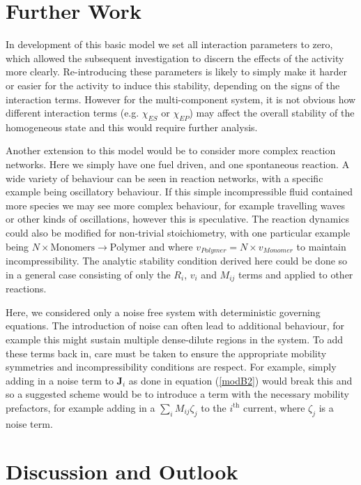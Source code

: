 \section{Further Work}

In development of this basic model we set all interaction parameters to zero, which allowed the subsequent investigation to discern the effects of the activity more clearly. Re-introducing these parameters is likely to simply make it harder or easier for the activity to induce this stability, depending on the signs of the interaction terms. However for the multi-component system, it is not obvious how different interaction terms (e.g. $\chi_{ES}$  or $\chi_{EP}$) may affect the overall stability of the homogeneous state and this would require further analysis. 

Another extension to this model would be to consider more complex reaction networks. Here we simply have one fuel driven, and one spontaneous reaction. A wide variety of behaviour can be seen in reaction networks, with a specific example being oscillatory behaviour. If this simple incompressible fluid contained more species we may see more complex behaviour, for example travelling waves or other kinds of oscillations, however this is speculative. The reaction dynamics could also be modified for non-trivial stoichiometry, with one particular example being $N \times \text{Monomers} \rightarrow \text{Polymer}$ and where $v_{Polymer} = N \times v_{Monomer}$ to maintain incompressibility. The analytic stability condition derived here could be done so in a general case consisting of only the $R_i$, $v_i$ and $M_{ij}$ terms and applied to other reactions.

Here, we considered only a noise free system with deterministic governing equations. The introduction of noise can often lead to additional behaviour, for example this might sustain multiple dense-dilute regions in the system. To add these terms back in, care must be taken to ensure the appropriate mobility symmetries and incompressibility conditions are respect. For example, simply adding in a noise term to $\textbf{J}_i$ as done in equation (\ref{modB2}) would break this and so a suggested scheme would be to introduce a term with the necessary mobility prefactors, for example  adding in a $\sum_i M_{ij}\zeta_j$ to the $i^{\text{th}}$ current, where $\zeta_j$ is a noise term.

\section{Discussion and Outlook}

